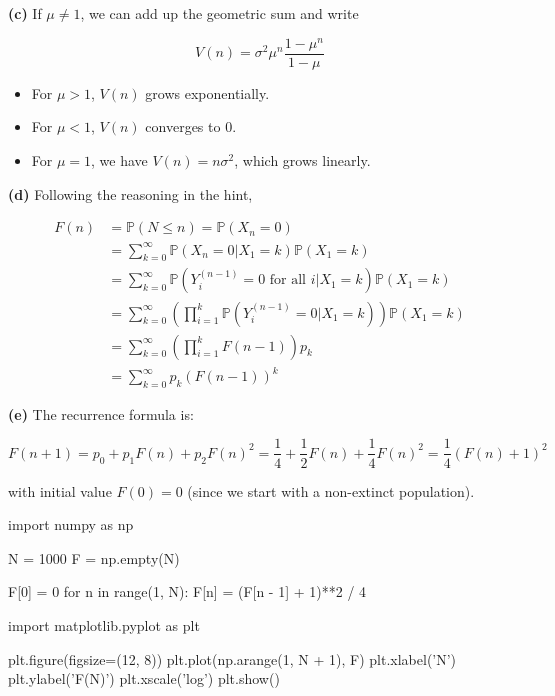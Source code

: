 \textbf{(c)} If \(\mu \neq 1\), we can add up the geometric sum and
write

\[ V(n) = \sigma^{2} \mu^{n} \frac{1 - \mu^{n}}{1 - \mu}\]

\begin{itemize}[tightlist]
\item
  For \(\mu > 1\), \(V(n)\) grows exponentially.\\
\item
  For \(\mu < 1\), \(V(n)\) converges to 0.\\
\item
  For \(\mu = 1\), we have \(V(n) = n \sigma^{2}\), which grows linearly.
\end{itemize}

\textbf{(d)} Following the reasoning in the hint,

\begin{align*}
F(n) &= \mathbb{P}(N \leq n) = \mathbb{P}(X_{n} = 0) \\
&= \sum_{k=0}^{\infty} \mathbb{P}(X_{n} = 0 | X_{1} = k) \mathbb{P}(X_{1} = k) \\
&= \sum_{k=0}^{\infty} \mathbb{P}(Y_{i}^{(n - 1)} = 0 \text{ for all } i | X_{1} = k) \mathbb{P}(X_{1} = k) \\
&= \sum_{k=0}^{\infty} \left( \prod_{i=1}^{k} \mathbb{P}(Y_{i}^{(n - 1)} = 0 | X_{1} = k) \right) \mathbb{P}(X_{1} = k) \\
&= \sum_{k=0}^{\infty} \left( \prod_{i=1}^{k} F(n-1) \right) p_{k} \\
&= \sum_{k=0}^{\infty} p_{k} \left( F(n - 1)\right)^{k}
\end{align*}

\textbf{(e)} The recurrence formula is:

\[ F(n + 1) = p_{0} + p_{1} F(n) + p_{2} F(n)^{2} = \frac{1}{4} + \frac{1}{2} F(n) + \frac{1}{4} F(n)^{2} = \frac{1}{4} (F(n) + 1)^{2}\]

with initial value \(F(0) = 0\) (since we start with a non-extinct
population).

\begin{python}
import numpy as np

N = 1000
F = np.empty(N)

F[0] = 0
for n in range(1, N):
    F[n] = (F[n - 1] + 1)**2 / 4
\end{python}

\begin{python}
import matplotlib.pyplot as plt

plt.figure(figsize=(12, 8))
plt.plot(np.arange(1, N + 1), F)
plt.xlabel('N')
plt.ylabel('F(N)')
plt.xscale('log')
plt.show()
\end{python}

